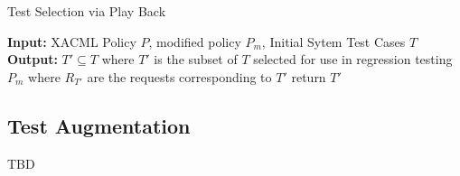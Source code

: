 \begin{algorithmic}
\begin{algorithm}[t]
\caption{Test Selection via Play Back}
\STATE \textbf{Input:} XACML Policy $P$, modified policy $P_{m}$, Initial Sytem Test Cases $T$
\STATE \textbf{Output:} $T' \subseteq T$ where $T'$ is the subset of $T$ selected for use in regression testing $P_{m}$
 where $R_{T'}$ are the requests corresponding to $T'$ 
\ENDIF
\ENDFOR
{}
\STATE return $T'$
\end{algorithm}
\end{algorithmic}


\subsection{Test Augmentation}
TBD









